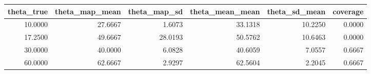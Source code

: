 \begin{tabular}{rrrrrr}
\toprule
theta_true & theta_map_mean & theta_map_sd & theta_mean_mean & theta_sd_mean & coverage \\
\midrule
10.0000 & 27.6667 & 1.6073 & 33.1318 & 10.2250 & 0.0000 \\
17.2500 & 49.6667 & 28.0193 & 50.5762 & 10.6463 & 0.0000 \\
30.0000 & 40.0000 & 6.0828 & 40.6059 & 7.0557 & 0.6667 \\
60.0000 & 62.6667 & 2.9297 & 62.5604 & 2.2045 & 0.6667 \\
\bottomrule
\end{tabular}
